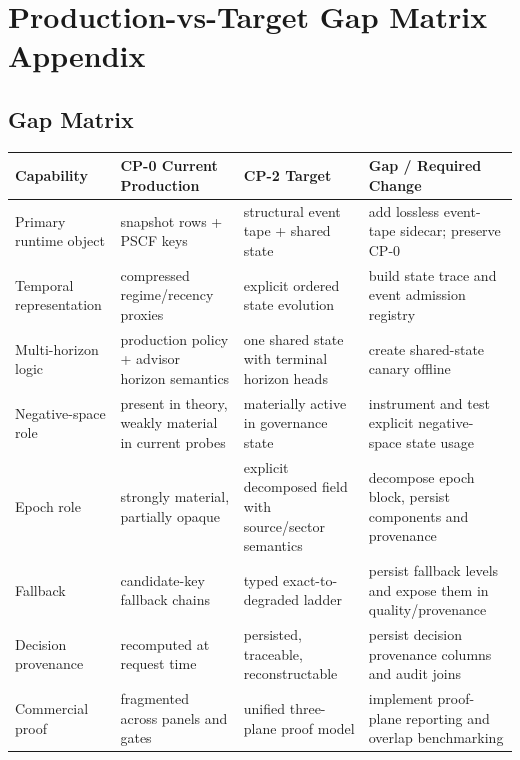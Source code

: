 \chapter{Production-vs-Target Gap Matrix Appendix}
\section{Gap Matrix}
\begin{longtable}{p{}p{}p{}p{}}
\toprule
Capability & CP-0 Current Production & CP-2 Target & Gap / Required Change \\
\midrule
Primary runtime object & snapshot rows + PSCF keys & structural event tape + shared state & add lossless event-tape sidecar; preserve CP-0 \\
Temporal representation & compressed regime/recency proxies & explicit ordered state evolution & build state trace and event admission registry \\
Multi-horizon logic & production policy + advisor horizon semantics & one shared state with terminal horizon heads & create shared-state canary offline \\
Negative-space role & present in theory, weakly material in current probes & materially active in governance state & instrument and test explicit negative-space state usage \\
Epoch role & strongly material, partially opaque & explicit decomposed field with source/sector semantics & decompose epoch block, persist components and provenance \\
Fallback & candidate-key fallback chains & typed exact-to-degraded ladder & persist fallback levels and expose them in quality/provenance \\
Decision provenance & recomputed at request time & persisted, traceable, reconstructable & persist decision provenance columns and audit joins \\
Commercial proof & fragmented across panels and gates & unified three-plane proof model & implement proof-plane reporting and overlap benchmarking \\
\bottomrule
\end{longtable}

